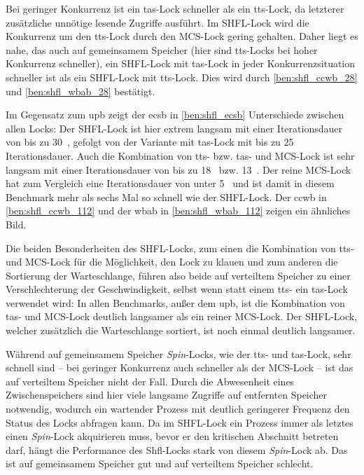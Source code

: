Bei geringer Konkurrenz ist ein \gls{tas}-Lock schneller
als ein \gls{tts}-Lock,
da letzterer zusätzliche unnötige lesende Zugriffe ausführt.
Im SHFL-Lock wird die Konkurrenz um den \gls{tts}-Lock
durch den MCS-Lock gering gehalten.
Daher liegt es nahe,
das auch auf gemeinsamem Speicher
(hier sind \gls{tts}-Locks bei hoher Konkurrenz schneller),
ein SHFL-Lock mit \gls{tas}-Lock in jeder Konkurrenzsituation schneller ist
als ein SHFL-Lock mit \gls{tts}-Lock.
Dies wird durch \autoref{ben:shfl_ccwb_28} und \autoref{ben:shfl_wbab_28} bestätigt.

Im Gegensatz zum \gls{upb} zeigt der \gls{ecsb} in \autoref{ben:shfl_ecsb} Unterschiede zwischen allen Locks:
Der SHFL-Lock ist hier extrem langsam
mit einer Iterationsdauer von bis zu 30~,
gefolgt von der Variante mit \gls{tas}-Lock
mit bis zu 25~ Iterationsdauer.
Auch die Kombination von \gls{tts}- bzw. \gls{tas}- und MCS-Lock ist sehr langsam
mit einer Iterationsdauer von bis zu 18~ bzw. 13~.
Der reine MCS-Lock hat zum Vergleich eine Iterationsdauer von unter 5~
und ist damit in diesem Benchmark mehr als sechs Mal so schnell
wie der SHFL-Lock.
Der \gls{ccwb} in \autoref{ben:shfl_ccwb_112}
und der \gls{wbab} in \autoref{ben:shfl_wbab_112} zeigen ein ähnliches Bild.

Die beiden Besonderheiten des SHFL-Locks,
zum einen die Kombination von \gls{tts}- und MCS-Lock für die Möglichkeit,
den Lock zu klauen
und zum anderen die Sortierung der Warteschlange,
führen also beide auf verteiltem Speicher zu einer Verschlechterung der Geschwindigkeit,
selbst wenn statt einem \gls{tts}- ein \gls{tas}-Lock verwendet wird:
In allen Benchmarks,
außer dem \gls{upb},
ist die Kombination von \gls{tas}- und MCS-Lock deutlich langsamer
als ein reiner MCS-Lock.
Der SHFL-Lock,
welcher zusätzlich die Warteschlange sortiert,
ist noch einmal deutlich langsamer.

Während auf gemeinsamem Speicher \textit{Spin}-Locks,
wie der \gls{tts}- und \gls{tas}-Lock,
sehr schnell sind
-- bei geringer Konkurrenz auch schneller als der MCS-Lock --
ist das auf verteiltem Speicher nicht der Fall.
Durch die Abwesenheit eines \gls{Zwischenspeicher}s sind hier viele langsame Zugriffe
auf entfernten Speicher notwendig,
wodurch ein wartender Prozess mit deutlich geringerer Frequenz den Status
des Locks abfragen kann.
Da im SHFL-Lock ein Prozess immer als letztes einen \textit{Spin}-Lock akquirieren muss,
bevor er den kritischen Abschnitt betreten darf,
hängt die Performance des Shfl-Locks stark von diesem \textit{Spin}-Lock ab.
Das ist auf gemeinsamem Speicher gut
und auf verteiltem Speicher schlecht.

